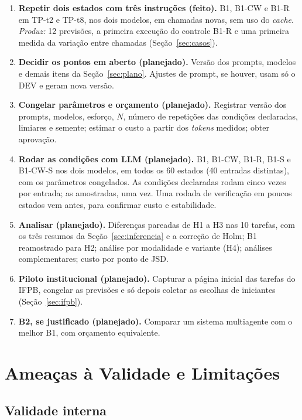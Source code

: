 \documentclass[12pt,oneside,a4paper,chapter=TITLE,english,brazil]{abntex2}
\begin{document}
\begin{enumerate}[label=\textbf{Passo \arabic*.},leftmargin=2.1cm,itemsep=3pt]
\item \textbf{Repetir dois estados com três instruções (feito).} B1, B1-CW e B1-R em TP-t2 e TP-t8, nos dois modelos, em chamadas novas, sem uso do \textit{cache}. \emph{Produz:} 12 previsões, a primeira execução do controle B1-R e uma primeira medida da variação entre chamadas (Seção~\ref{sec:casos}).
\item \textbf{Decidir os pontos em aberto (planejado).} Versão dos prompts, modelos e demais itens da Seção~\ref{sec:plano}. Ajustes de prompt, se houver, usam só o DEV e geram nova versão.
\item \textbf{Congelar parâmetros e orçamento (planejado).} Registrar versão dos prompts, modelos, esforço, $N$, número de repetições das condições declaradas, limiares e semente; estimar o custo a partir dos \textit{tokens} medidos; obter aprovação.
\item \textbf{Rodar as condições com LLM (planejado).} B1, B1-CW, B1-R, B1-S e B1-CW-S nos dois modelos, em todos os 60 estados (40 entradas distintas), com os parâmetros congelados. As condições declaradas rodam cinco vezes por entrada; as amostradas, uma vez. Uma rodada de verificação em poucos estados vem antes, para confirmar custo e estabilidade.
\item \textbf{Analisar (planejado).} Diferenças pareadas de H1 a H3 nas 10 tarefas, com os três resumos da Seção~\ref{sec:inferencia} e a correção de Holm; B1 reamostrado para H2; análise por modalidade e variante (H4); análises complementares; custo por ponto de JSD.
\item \textbf{Piloto institucional (planejado).} Capturar a página inicial das tarefas do IFPB, congelar as previsões e só depois coletar as escolhas de iniciantes (Seção~\ref{sec:ifpb}).
\item \textbf{B2, se justificado (planejado).} Comparar um sistema multiagente com o melhor B1, com orçamento equivalente.
\end{enumerate}

\section{Ameaças à Validade e Limitações}
\label{sec:ameacas}

\subsection{Validade interna}
\end{document}
